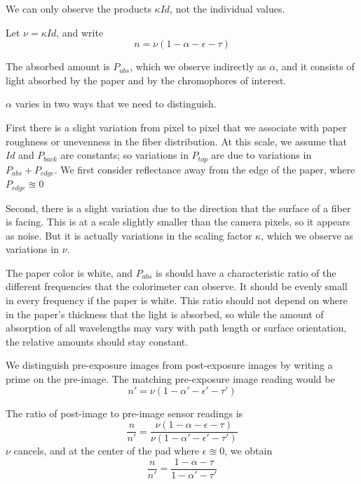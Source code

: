 \documentclass[11pt,letter]{article}
\begin{document}
We can only observe the products  $\kappa I d$, not the individual values.

Let $\nu = \kappa I d$, and write 
\begin{equation}
	n = \nu(1 - \alpha - \epsilon - \tau)
\end{equation}

The absorbed amount is $P_{abs}$, which we observe indirectly as $\alpha$, and it consists of light absorbed by the paper and by the chromophores of interest.  

$\alpha$ varies in two ways that we need to distinguish.  

First there is a slight variation from pixel to pixel that we associate with paper roughness or unevenness in the fiber distribution.  
At this scale, we assume that $I d$ and $P_{back}$ are constants;
so variations in  $P_{top}$ are due to variations in $P_{abs} + P_{edge}$.
We first consider reflectance away from the edge of the paper, where $P_{edge} \approxeq 0$ 

Second, there is a slight variation due to the direction that the surface of a fiber is facing.  This is at a scale slightly smaller than the camera pixels, so it appears as noise.  But it is actually variations in the scaling factor $\kappa$, which we observe as variations in $\nu$.

The paper color is white, and $P_{abs}$ is should have a characteristic ratio of the different frequencies that the colorimeter can observe.
It should be evenly small in every frequency if the paper is white.
This ratio should not depend on where in the paper's thickness that the light is absorbed, 
so while the amount of absorption of all wavelengths may vary with path length or surface orientation, the relative amounts should stay constant.

 
We distinguish pre-exposure images from post-exposure images by writing a prime on the pre-image. 
The matching  pre-exposure image reading would be 
\begin{equation}
	n' = \nu(1 - \alpha' - \epsilon' - \tau')
\end{equation}

The ratio of post-image to pre-image sensor readings is
\begin{equation}
	\frac{n}{n'} = \frac{\nu(1 - \alpha - \epsilon - \tau)}
	                    {\nu(1 - \alpha' - \epsilon' - \tau')}
\end{equation} 
$\nu$ cancels, and at the center of the pad where  $\epsilon \approxeq 0$, we obtain
\begin{equation}
	\frac{n}{n'} = \frac{1 - \alpha - \tau}
	                    {1 - \alpha' - \tau'}
\end{equation} 
 
 
\end{document}
